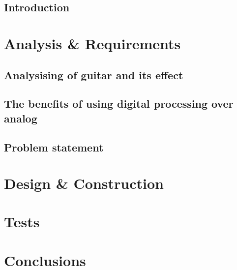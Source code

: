 \glsresetall
 \graphicspath{{figures/analysing/}}
\chapter{Introduction}

\part{Analysis \& Requirements}\label{pt:analysis} \glsresetall
 \graphicspath{{figures/analysing/}}
 \chapter{Analysising of guitar and its effect}\label{ch:analysing}
 \label{sec:electric_guitar_theory} 

\label{sec:platform_comparing}

 \label{sec:FPGA}

\chapter{The benefits of using digital processing over analog}

 \label{sec:digital_vs_analog}

\chapter{Problem statement}




\part{Design \& Construction}\label{pt:design} 
 
%
\part{Tests}\label{pt:tests} 
\part{Conclusions}\label{pt:conclusions} 
%

